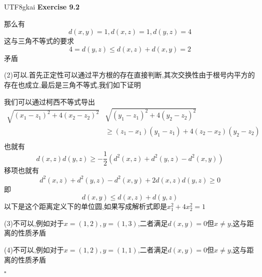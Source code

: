 \documentclass{article}
\newenvironment{exercise}[1]{%
{\textbf{Exercise #1} \\ 
    }
}{
  \hfill $\square$ 
  \par\bigskip 
}
\begin{document}
\begin{CJK}{UTF8}{gkai}
\begin{exercise}{9.2}
    那么有
    \[d(x,y) = 1,d(x,z) = 1,d(y,z) = 4\]
    这与三角不等式的要求
    \[4 = d(y,z) \leq d(x,z) + d(x,y) = 2\]
    矛盾

    (2)可以.首先正定性可以通过平方根的存在直接判断,其次交换性由于根号内平方的存在也成立,最后是三角不等式,我们如下证明

    我们可以通过柯西不等式导出
    \[\begin{aligned}
        \sqrt{(x_1 - z_1)^2 + 4(x_2 - z_2)^2} &\sqrt{(y_1 - z_1)^2 + 4(y_2 - z_2)^2}\\
        &\geq (z_1 - x_1)(y_1 - z_1) + 4(z_2 - x_2)(y_2 - z_2)\\
    \end{aligned} 
    \]
    也就有
    \[d(x,z) d(y,z) \geq -\frac{1}{2}(d^2(x,z) + d^2(y,z) - d^2(x,y))\]
    移项也就有
    \[d^2(x,z) + d^2(y,z) - d^2(x,y) + 2 d(x,z) d(y,z) \geq 0\]
    即
    \[d(x,y) \leq d(x,z) + d(y,z)\]
    以下是这个距离定义下的单位圆,如果写成解析式即是$x_1^2 + 4x_2^2 = 1$
    \begin{center}
    \end{center}

    (3)不可以,例如对于$x = (1,2),y = (1,3)$,二者满足$d(x,y) = 0$但$x \neq y$,这与距离的性质矛盾

    (4)不可以,例如对于$x = (1,2),y = (1,1)$,二者满足$d(x,y) = 0$但$x \neq y$,这与距离的性质矛盾
\end{exercise}

\end{CJK}
\end{document}
